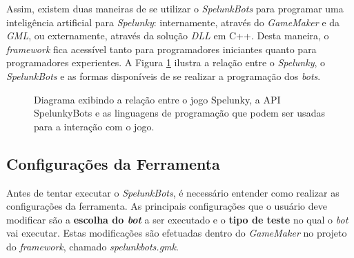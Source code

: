 Assim, existem duas maneiras de se utilizar o \textit{SpelunkBots} para
programar uma inteligência artificial para \textit{Spelunky}: internamente,
através do \textit{GameMaker} e da \textit{GML}, ou externamente, através da
solução \textit{DLL} em C++. Desta maneira, o \textit{framework} fica acessível
tanto para programadores iniciantes quanto para programadores experientes.  A
Figura \ref{fig:spelunkbots-usage-diagram} ilustra a relação entre o
\textit{Spelunky}, o \textit{SpelunkBots} e as formas disponíveis de se realizar
a programação dos \textit{bots}.

\begin{figure}[htb!]
\centering
{}
\caption {\label{fig:spelunkbots-usage-diagram}Diagrama exibindo a relação
entre o jogo Spelunky, a API SpelunkyBots e as linguagens de programação que
podem ser usadas para a interação com o jogo.}
\end{figure}


\subsection{Configurações da Ferramenta}
Antes de tentar executar o \textit{SpelunkBots}, é necessário entender como
realizar as configurações da ferramenta. As principais configurações que o
usuário deve modificar são a \textbf{escolha do \textit{bot}} a ser executado e
o \textbf{tipo de teste} no qual o \textit{bot} vai executar. Estas modificações
são efetuadas dentro do \textit{GameMaker} no projeto do \textit{framework},
chamado \textit{spelunkbots.gmk}.

